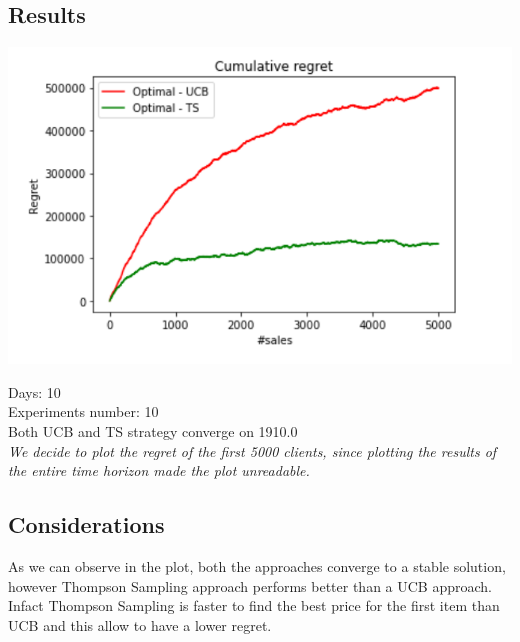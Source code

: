 \subsection*{Results}
\begin{center}
	\includegraphics[scale=1.2]{Images/n3}
\end{center}
Days: 10\\
Experiments number: 10 \\
Both UCB and TS strategy converge on 1910.0\\
\textit{We decide to plot the regret of the first 5000 clients, since plotting the results of the entire time horizon made the plot unreadable.}


\subsection*{Considerations}
As we can observe in the plot, both the approaches converge to a stable solution, however Thompson Sampling approach performs better than a UCB approach. Infact Thompson Sampling is faster to find the best price for the first item than UCB and this allow to have a lower regret. 